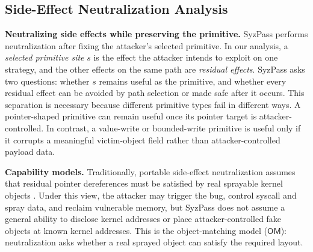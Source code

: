 

\subsection{Side-Effect Neutralization Analysis}
\noindent\textbf{Neutralizing side effects while preserving the primitive.}
SyzPass performs neutralization after fixing the attacker's selected primitive. In our analysis, a \emph{selected primitive site} $s$ is the effect the attacker intends to exploit on one strategy, and the other effects on the same path are \emph{residual effects}. SyzPass asks two questions: whether $s$ remains useful as the primitive, and whether every residual effect can be avoided by path selection or made safe after it occurs. This separation is necessary because different primitive types fail in different ways. A pointer-shaped primitive can remain useful once its pointer target is attacker-controlled. In contrast, a value-write or bounded-write primitive is useful only if it corrupts a meaningful victim-object field rather than attacker-controlled payload data.

\noindent\textbf{Capability models.}
Traditionally, portable side-effect neutralization assumes that residual pointer dereferences must be satisfied by real sprayable kernel objects \cite{SETTLERS66:online}. Under this view, the attacker may trigger the bug, control syscall and spray data, and reclaim vulnerable memory, but SyzPass does not assume a general ability to disclose kernel addresses or place attacker-controlled fake objects at known kernel addresses. This is the object-matching model ($\mathsf{OM}$): neutralization asks whether a real sprayed object can satisfy the required layout.

